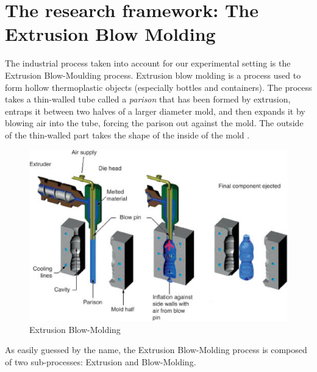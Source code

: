\section{The research framework: The Extrusion Blow Molding}


The industrial process taken into account for our experimental setting is the Extrusion Blow-Moulding process. Extrusion blow molding is a process used to form hollow thermoplastic objects (especially bottles and containers). The process takes a thin-walled tube called a \textit{parison} that has been formed by extrusion, entraps it between two halves of a larger diameter mold, and then expands it by blowing air into the tube, forcing the parison out against the mold. The outside of the thin-walled part takes the shape of the inside of the mold \citep{poli2001design}.

\begin{figure}
\centerline{\includegraphics[scale=0.75]{images/chapter_1/extrusion_blow_molding.eps}}
\caption{Extrusion Blow-Molding \citep{goodship2015design}}
\label{fig:Extrusion Blow-Molding}
\end{figure}

As easily guessed by the name, the Extrusion Blow-Molding process is composed of two sub-processes: Extrusion and Blow-Molding.

